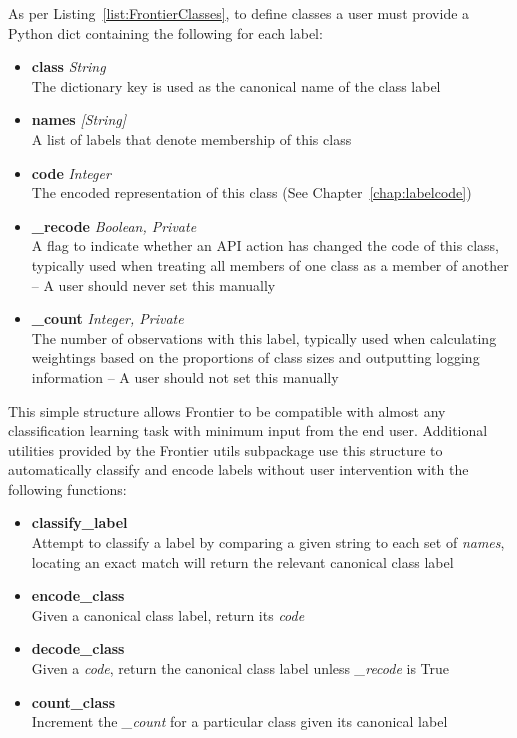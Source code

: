 As per Listing~\ref{list:FrontierClasses}, to define classes a user must provide
a Python dict containing the following for each label:

\begin{itemize}
    \item \textbf{class} \textit{String}\hfill\\
        The dictionary key is used as the canonical name of the class label
    \item \textbf{names} \textit{[String]}\hfill\\
        A list of labels that denote membership of this class
    \item \textbf{code} \textit{Integer}\hfill\\
        The encoded representation of this class (See Chapter~\ref{chap:labelcode})
    \item \textbf{\_recode} \textit{Boolean, Private}\hfill\\
        A flag to indicate whether an API action has changed the code of this
        class, typically used when treating all members of one class as a member
        of another -- A user should never set this manually
    \item \textbf{\_count} \textit{Integer, Private}\hfill\\
        The number of observations with this label, typically used when
        calculating weightings based on the proportions of class sizes and
        outputting logging information -- A user should not set this manually
\end{itemize}

This simple structure allows Frontier to be compatible with almost any
classification learning task with minimum input from the end user. Additional
utilities provided by the Frontier utils subpackage use this structure to
automatically classify and encode labels without user intervention with the
following functions:

\begin{itemize}
    \item \textbf{classify\_label} \hfill\\
        Attempt to classify a label by comparing a given string to each set of
        \textit{names}, locating an exact match will return the relevant
        canonical class label
    \item \textbf{encode\_class} \hfill\\
        Given a canonical class label, return its \textit{code}
    \item \textbf{decode\_class} \hfill\\
        Given a \textit{code}, return the canonical class label unless
        \textit{\_recode} is True
    \item \textbf{count\_class} \hfill\\
        Increment the \textit{\_count} for a particular class given its
        canonical label
\end{itemize}

